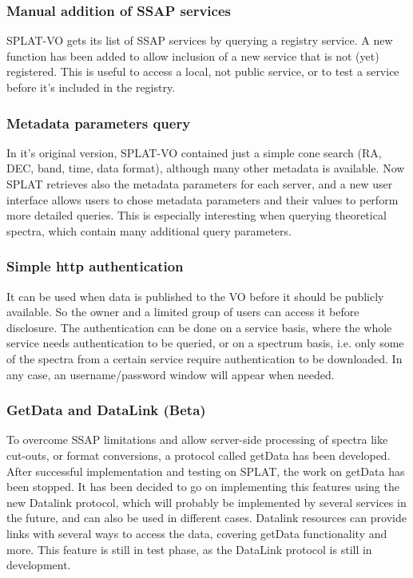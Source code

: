 \documentclass[final,authoryear,5p,times,twocolumn]{elsarticle}
\begin{document}
\subsubsection{Manual addition of SSAP services}

SPLAT-VO gets its list of SSAP services by querying a registry
service.  A new function has been added to allow inclusion of a new
service that is not (yet) registered. This is useful to access a
local, not public service, or to test a service before it's included
in the registry.

\subsubsection{Metadata parameters query}

In it's original version, SPLAT-VO contained just a simple cone search
(RA, DEC, band, time, data format), although many other metadata is
available.  Now SPLAT retrieves also the metadata parameters for each
server, and a new user interface allows users to chose metadata
parameters and their values to perform more detailed queries.  This is
especially interesting when querying theoretical spectra, which
contain many additional query parameters.

\subsubsection{Simple http authentication}

It can be used when data is published to the VO before it should be
publicly available. So the owner and a limited group of users can
access it before disclosure. The authentication can be done on a
service basis, where the whole service needs authentication to be
queried, or on a spectrum basis, i.e. only some of the spectra from a
certain service require authentication to be downloaded. In any case,
an username/password window will appear when needed.

\subsubsection{GetData and DataLink (Beta)}

To overcome SSAP limitations and allow server-side processing of
spectra like cut-outs, or format conversions, a protocol called
getData has been developed. After successful implementation and
testing on SPLAT, the work on getData has been stopped. It has been
decided to go on implementing this features using the new Datalink
protocol, which will probably be implemented by several services in
the future, and can also be used in different cases.  Datalink
resources can provide links with several ways to access the data,
covering getData functionality and more. This feature is still in test
phase, as the DataLink protocol is still in development.
\end{document}
